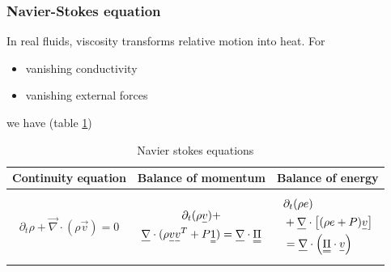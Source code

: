 \subsubsection{Navier-Stokes equation}
In real fluids, viscosity transforms relative motion into heat. For
\begin{itemize}
    \item vanishing conductivity
    \item vanishing external forces
\end{itemize}
we have (table \ref{tab:navier_stokes_eq})

\begin{table}[!htb]
    \centering
    \begin{tabular}{|p{}|p{}|p{}|}
        \hline
        \textcolor{blue1}{Continuity equation} & \textcolor{blue1}{Balance of momentum} &  \textcolor{blue1}{Balance of energy} \\
        \hline
        \begin{equation}
            \partial_t \rho + \vec{\nabla} \cdot (\rho \vec{v}) = 0
        \end{equation} &
        \begin{equation}
            \begin{gathered}
                \partial_t (\rho \vec{v}) + \\ \vec{\nabla} \cdot (\rho \vec{v}\vec{v}^T + P\mat{1}) = \vec{\nabla} \cdot \mat{\Pi}
            \end{gathered}
        \end{equation} &
        \begin{equation}
            \begin{aligned}
                & \partial_t (\rho e) \\ &+ \vec{\nabla} \cdot \left[(\rho e + P)\vec{v} \right] \\ &= \vec{\nabla} \cdot \left( \mat{\Pi} \cdot \vec{v} \right)
            \end{aligned}
        \end{equation} \\
        \hline
    \end{tabular}
    \caption{Navier stokes equations}
    \label{tab:navier_stokes_eq}
\end{table}

